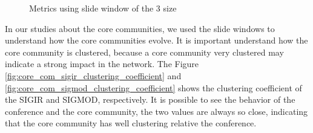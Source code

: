 \begin{figure}[!htb]
\begin{center}
{  }%
  \end{center}
  \caption{Metrics using slide window of the 3 size}
  \label{fig:metrics_slide_window}
\end{figure}

In our studies about the core communities, we used the slide windows to understand how the core communities evolve. It is important
understand how the core community is clustered, because a core community very clustered may indicate a strong impact in the network.
The Figure \ref{fig:core_com_sigir_clustering_coefficient} and \ref{fig:core_com_sigmod_clustering_coefficient} shows the clustering 
coefficient of the SIGIR and SIGMOD, respectively. It is possible to see the behavior of the conference and the core community, the
two values are always so close, indicating that the core community has well clustering relative the conference.\\


